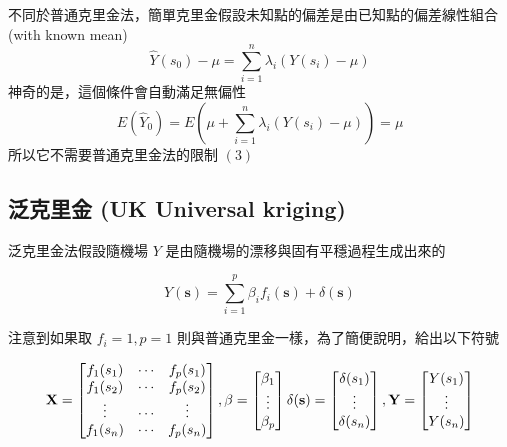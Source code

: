 \documentclass[
]{book}
\begin{document}
不同於普通克里金法，簡單克里金假設未知點的偏差是由已知點的偏差線性組合(with known mean)
\[
\hat Y(s_0) - \mu = \sum_{i=1}^n\lambda_i(Y(s_i) - \mu)
\]
神奇的是，這個條件會自動滿足無偏性
\[
E(\hat Y_0) = E(\mu + \sum_{i=1}^n\lambda_i(Y(s_i) - \mu)) = \mu
\]
所以它不需要普通克里金法的限制 \((3)\)

\hypertarget{ux6cdbux514bux91ccux91d1-uk-universal-kriging}{%
\subsection{泛克里金 (UK Universal kriging)}\label{ux6cdbux514bux91ccux91d1-uk-universal-kriging}}

泛克里金法假設隨機場 \(Y\) 是由隨機場的漂移與固有平穩過程生成出來的

\[
Y(\mathbf{s}) = \sum_{i=1}^p\beta_if_i(\mathbf{s}) + \delta(\mathbf{s})
\]

注意到如果取 \(f_i = 1,p=1\) 則與普通克里金一樣，為了簡便說明，給出以下符號

\[
\mathbf{X} = \begin{bmatrix}f_1(s_1)&\cdots&f_p(s_1)\\f_1(s_2)&\cdots&f_p(s_2)\\\vdots&\cdots&\vdots\\f_1(s_n)&\cdots&f_p(s_n)\end{bmatrix},\mathbf{\beta} = \begin{bmatrix}\beta_1\\\vdots\\\beta_p\end{bmatrix} \\
\mathbf{\delta(s)} = \begin{bmatrix}\delta(s_1)\\\vdots\\\delta(s_n)\end{bmatrix}, \mathbf{Y} = \begin{bmatrix}Y(s_1)\\\vdots\\Y(s_n)\end{bmatrix}
\]
\end{document}
